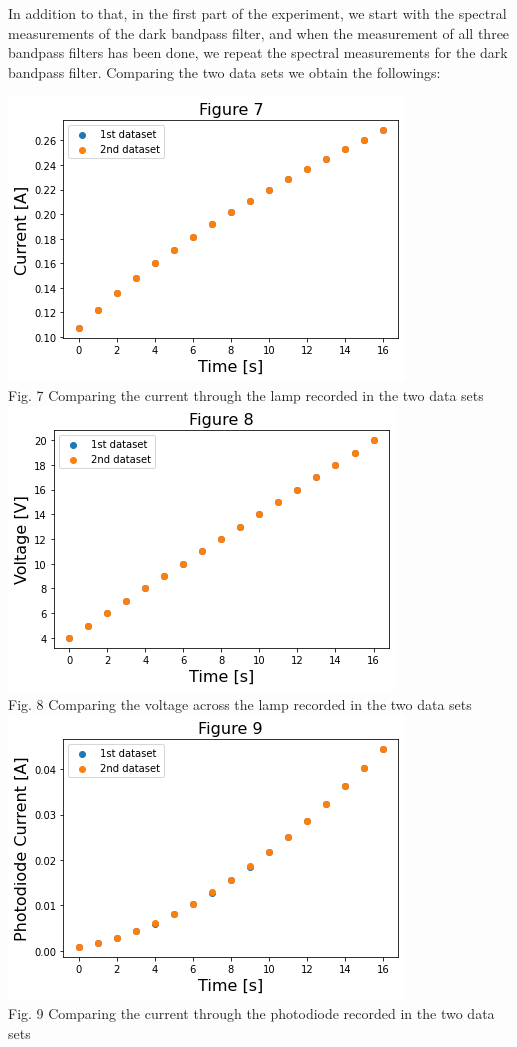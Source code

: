 \documentclass[11pt]{book}
\theoremstyle{break}
\theoremstyle{break}
\begin{document}
In addition to that, in the first part of the experiment, we start with the spectral measurements of the dark bandpass filter, and when the measurement of all three bandpass filters has been done, we repeat the spectral measurements for the dark bandpass filter. Comparing the two data sets we obtain the followings:
\begin{center}
\includegraphics[scale=0.65]{comp1.png}\\
Fig. 7 Comparing the current through the lamp recorded in the two data sets\\
\hfill\break
\hfill\break
\hfill\break
\hfill\break
\includegraphics[scale=0.65]{comp2.png}\\
Fig. 8 Comparing the voltage across the lamp recorded in the two data sets\\
\newpage
\includegraphics[scale=0.65]{comp3.png}\\
Fig. 9 Comparing the current through the photodiode recorded in the two data sets\\
\end{center}
\end{document}
